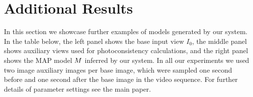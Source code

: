 \appendix

\section{Additional Results}

In this section we showcase further examples of models generated by
our system. In the table below, the left panel shows the base input
view $I_0$, the middle panel shows auxiliary views used for
photoconsistency calculations, and the right panel shows the MAP model
$M$ inferred by our system. In all our experiments we used two
image auxiliary images per base image, which were sampled one second
before and one second after the base image in the video sequence. For
further details of parameter settings see the main paper.

\newcommand{\ResultIm}[7]{\texttt{[image: figures\_addendum/\#2/\#3\_\#4\_frame\#5\_\#6.\#7]}}
\newcommand{\ShowcaseIm}[4]{\ResultIm{0.23}{resized_full_results}{#1}{#2}{#3}{#4}{jpg}}
\newcommand{\AuxIm}[4]{\ResultIm{0.1}{aux_links/resized}{#1}{#2}{#3}{#4}{jpg}}
\newcommand{\ShowcaseRow}[3]{
        \ShowcaseIm{#1}{#2}{#3}{orig} &
        \AuxIm{#1}{#2}{#3}{aux0}
        \AuxIm{#1}{#2}{#3}{aux1} &
        \ShowcaseIm{#1}{#2}{#3}{dp} &
}
\newcommand{\ShowcaseRowLast}[3]{  %
        \ShowcaseIm{#1}{#2}{#3}{orig} &
        \AuxIm{#1}{#2}{#3}{aux0}
        \AuxIm{#1}{#2}{#3}{aux0} &
        \ShowcaseIm{#1}{#2}{#3}{dp} &
}
\newcommand{\ShowcaseRowFirst}[3]{  %
        \ShowcaseIm{#1}{#2}{#3}{orig} &
        \AuxIm{#1}{#2}{#3}{aux1}
        \AuxIm{#1}{#2}{#3}{aux1} &
        \ShowcaseIm{#1}{#2}{#3}{dp} &
}

\newcommand\ColHeadings{\textbf{Input (base view)} & \textbf{(auxiliary views)} & \textbf{Output of our system}}


